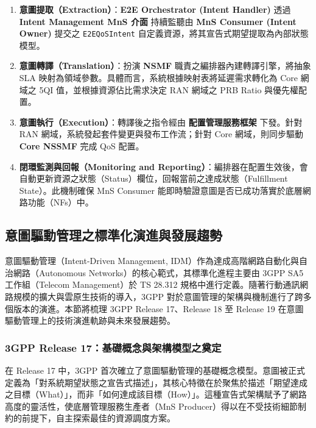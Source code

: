 \begin{enumerate}
\item \textbf{意圖提取（Extraction）}：\textbf{E2E Orchestrator (Intent Handler)} 透過 \textbf{Intent Management MnS 介面} 持續監聽由 \textbf{MnS Consumer (Intent Owner)} 提交之 \texttt{E2EQoSIntent} 自定義資源，將其宣告式期望提取為內部狀態模型。
\item \textbf{意圖轉譯（Translation）}：扮演 \textbf{NSMF} 職責之編排器內建轉譯引擎，將抽象 SLA 映射為領域參數。具體而言，系統根據映射表將延遲需求轉化為 Core 網域之 5QI 值，並根據資源佔比需求決定 RAN 網域之 PRB Ratio 與優先權配置。
\item \textbf{意圖執行（Execution）}：轉譯後之指令經由 \textbf{配置管理服務框架} 下發。針對 RAN 網域，系統發起套件變更與發布工作流；針對 Core 網域，則同步驅動 \textbf{Core NSSMF} 完成 QoS 配置。
\item \textbf{閉環監測與回報（Monitoring and Reporting）}：編排器在配置生效後，會自動更新資源之狀態（Status）欄位，回報當前之達成狀態（Fulfillment State）。此機制確保 MnS Consumer 能即時驗證意圖是否已成功落實於底層網路功能（NFs）中。
\end{enumerate}

\subsection{意圖驅動管理之標準化演進與發展趨勢}

意圖驅動管理（Intent-Driven Management, IDM）作為達成高階網路自動化與自治網路（Autonomous Networks）的核心範式，其標準化進程主要由 3GPP SA5 工作組（Telecom Management）於 TS 28.312 規格中進行定義。隨著行動通訊網路規模的擴大與雲原生技術的導入，3GPP 對於意圖管理的架構與機制進行了跨多個版本的演進。本節將梳理 3GPP Release 17、Release 18 至 Release 19 在意圖驅動管理上的技術演進軌跡與未來發展趨勢。

\subsubsection{3GPP Release 17：基礎概念與架構模型之奠定}

在 Release 17 中，3GPP 首次確立了意圖驅動管理的基礎概念模型。意圖被正式定義為「對系統期望狀態之宣告式描述」，其核心特徵在於聚焦於描述「期望達成之目標（What）」，而非「如何達成該目標（How）」。這種宣告式架構賦予了網路高度的靈活性，使底層管理服務生產者（MnS Producer）得以在不受技術細節制約的前提下，自主探索最佳的資源調度方案。

